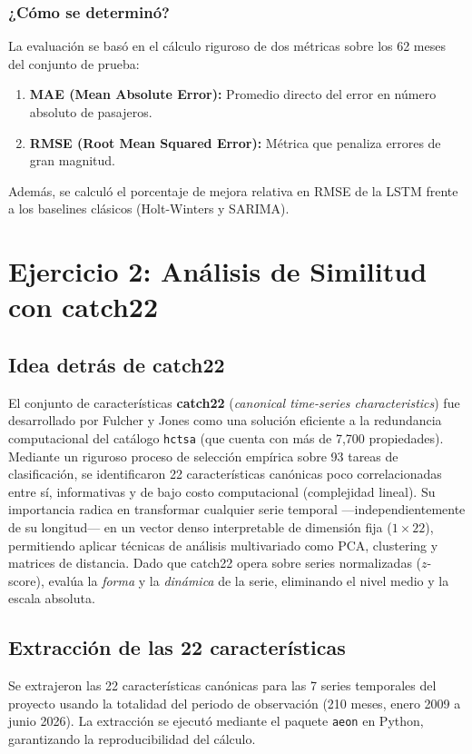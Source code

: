 \documentclass[11pt, a4paper]{article}
\begin{document}
\subsubsection{¿Cómo se determinó?}
La evaluación se basó en el cálculo riguroso de dos métricas sobre los 62 meses del conjunto de prueba:
\begin{enumerate}
    \item \textbf{MAE (Mean Absolute Error):} Promedio directo del error en número absoluto de pasajeros.
    \item \textbf{RMSE (Root Mean Squared Error):} Métrica que penaliza errores de gran magnitud.
\end{enumerate}
Además, se calculó el porcentaje de mejora relativa en RMSE de la LSTM frente a los baselines clásicos (Holt-Winters y SARIMA).

\newpage

\section{Ejercicio 2: Análisis de Similitud con catch22}

\subsection{Idea detrás de catch22}
El conjunto de características \textbf{catch22} (\textit{canonical time-series characteristics}) fue desarrollado por Fulcher y Jones como una solución eficiente a la redundancia computacional del catálogo \texttt{hctsa} (que cuenta con más de 7,700 propiedades). Mediante un riguroso proceso de selección empírica sobre 93 tareas de clasificación, se identificaron 22 características canónicas poco correlacionadas entre sí, informativas y de bajo costo computacional (complejidad lineal). Su importancia radica en transformar cualquier serie temporal ---independientemente de su longitud--- en un vector denso interpretable de dimensión fija ($1 \times 22$), permitiendo aplicar técnicas de análisis multivariado como PCA, clustering y matrices de distancia. Dado que catch22 opera sobre series normalizadas ($z$-score), evalúa la \emph{forma} y la \emph{dinámica} de la serie, eliminando el nivel medio y la escala absoluta.

\subsection{Extracción de las 22 características}
Se extrajeron las 22 características canónicas para las 7 series temporales del proyecto usando la totalidad del periodo de observación (210 meses, enero 2009 a junio 2026). La extracción se ejecutó mediante el paquete \texttt{aeon} en Python, garantizando la reproducibilidad del cálculo.
\end{document}
